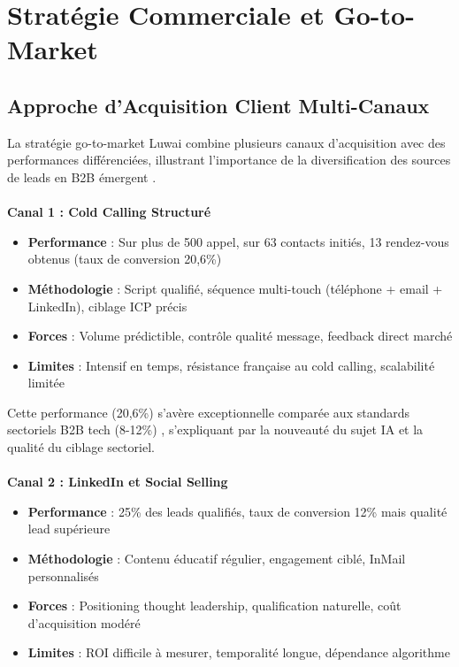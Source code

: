 \section{Stratégie Commerciale et Go-to-Market}

\subsection{Approche d'Acquisition Client Multi-Canaux}

La stratégie go-to-market Luwai combine plusieurs canaux d'acquisition avec des performances différenciées, illustrant l'importance de la diversification des sources de leads en B2B émergent \cite{weinberg2015traction}.
\\\\
\textbf{Canal 1 : Cold Calling Structuré}
\begin{itemize}
    \item \textbf{Performance} : Sur plus de 500 appel, sur 63 contacts initiés, 13 rendez-vous obtenus (taux de conversion 20,6\%)
    \item \textbf{Méthodologie} : Script qualifié, séquence multi-touch (téléphone + email + LinkedIn), ciblage ICP précis
    \item \textbf{Forces} : Volume prédictible, contrôle qualité message, feedback direct marché
    \item \textbf{Limites} : Intensif en temps, résistance française au cold calling, scalabilité limitée
\end{itemize}
\medskip
Cette performance (20,6\%) s'avère exceptionnelle comparée aux standards sectoriels B2B tech (8-12\%) \cite{salesforce2024benchmarks}, s'expliquant par la nouveauté du sujet IA et la qualité du ciblage sectoriel.
\\\\
\textbf{Canal 2 : LinkedIn et Social Selling}
\begin{itemize}
    \item \textbf{Performance} : 25\% des leads qualifiés, taux de conversion 12\% mais qualité lead supérieure
    \item \textbf{Méthodologie} : Contenu éducatif régulier, engagement ciblé, InMail personnalisés
    \item \textbf{Forces} : Positioning thought leadership, qualification naturelle, coût d'acquisition modéré
    \item \textbf{Limites} : ROI difficile à mesurer, temporalité longue, dépendance algorithme
\end{itemize}
